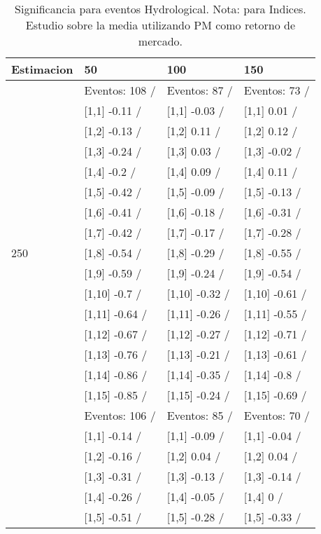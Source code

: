 \begin{table}

\caption{Significancia para eventos Hydrological. Nota: para Indices. Estudio sobre la media utilizando PM como retorno de mercado.}
\centering
\begin{tabular}[t]{llll}
\toprule
Estimacion & 50 & 100 & 150\\
\midrule
 & Eventos:  108 / & Eventos:  87 / & Eventos:  73 /\\
 & {}[1,1] -0.11  / & {}[1,1] -0.03  / & {}[1,1] 0.01  /\\
 & {}[1,2] -0.13  / & {}[1,2] 0.11  / & {}[1,2] 0.12  /\\
 & {}[1,3] -0.24  / & {}[1,3] 0.03  / & {}[1,3] -0.02  /\\
 & {}[1,4] -0.2  / & {}[1,4] 0.09  / & {}[1,4] 0.11  /\\
\addlinespace
 & {}[1,5] -0.42  / & {}[1,5] -0.09  / & {}[1,5] -0.13  /\\
 & {}[1,6] -0.41  / & {}[1,6] -0.18  / & {}[1,6] -0.31  /\\
 & {}[1,7] -0.42  / & {}[1,7] -0.17  / & {}[1,7] -0.28  /\\
250 & {}[1,8] -0.54  / & {}[1,8] -0.29  / & {}[1,8] -0.55  /\\
 & {}[1,9] -0.59  / & {}[1,9] -0.24  / & {}[1,9] -0.54  /\\
\addlinespace
 & {}[1,10] -0.7  / & {}[1,10] -0.32  / & {}[1,10] -0.61  /\\
 & {}[1,11] -0.64  / & {}[1,11] -0.26  / & {}[1,11] -0.55  /\\
 & {}[1,12] -0.67  / & {}[1,12] -0.27  / & {}[1,12] -0.71  /\\
 & {}[1,13] -0.76  / & {}[1,13] -0.21  / & {}[1,13] -0.61  /\\
 & {}[1,14] -0.86  / & {}[1,14] -0.35  / & {}[1,14] -0.8  /\\
\addlinespace
 & {}[1,15] -0.85  / & {}[1,15] -0.24  / & {}[1,15] -0.69  /\\
 & Eventos:  106 / & Eventos:  85 / & Eventos:  70 /\\
 & {}[1,1] -0.14  / & {}[1,1] -0.09  / & {}[1,1] -0.04  /\\
 & {}[1,2] -0.16  / & {}[1,2] 0.04  / & {}[1,2] 0.04  /\\
 & {}[1,3] -0.31  / & {}[1,3] -0.13  / & {}[1,3] -0.14  /\\
\addlinespace
 & {}[1,4] -0.26  / & {}[1,4] -0.05  / & {}[1,4] 0  /\\
 & {}[1,5] -0.51  / & {}[1,5] -0.28  / & {}[1,5] -0.33  /\\

\end{tabular}
\end{table}
